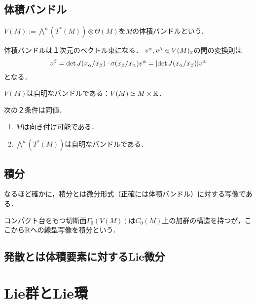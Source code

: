 \documentclass[uplatex,dvipdfmx]{jsreport}
\begin{document}
\subsection{体積バンドル}

\begin{definition}
    $V(M):=\bigwedge^n(T^*(M))\otimes\Theta(M)$を$M$の体積バンドルという．
\end{definition}
\begin{remarks}
    体積バンドルは１次元のベクトル束になる．
    $v^\alpha,v^\beta\in V(M)_x$の間の変換則は
    \[v^\beta=\det J(x_\alpha/x_\beta)\cdot\sigma(x_\beta/x_\alpha)v^\alpha=\lvert\det J(x_\alpha/x_\beta)\rvert v^\alpha\]
    となる．
\end{remarks}

\begin{theorem}
    $V(M)$は自明なバンドルである：$V(M)\simeq M\times\mathbb{R}$．
\end{theorem}

\begin{corollary}
    次の２条件は同値．
    \begin{enumerate}
        \item $M$は向き付け可能である．
        \item $\bigwedge^n(T^*(M))$は自明なバンドルである．
    \end{enumerate}
\end{corollary}

\subsection{積分}

\begin{tcolorbox}[colframe=ForestGreen, colback=ForestGreen!10!white,breakable,colbacktitle=ForestGreen!40!white,coltitle=black,fonttitle=\bfseries\sffamily,
title=]
    なるほど確かに，積分とは微分形式（正確には体積バンドル）に対する写像である．
\end{tcolorbox}

\begin{definition}
    コンパクト台をもつ切断面$\Gamma_0(V(M))$は$C_0(M)$上の加群の構造を持つが，ここから$\mathbb{R}$への線型写像を積分という．
\end{definition}

\subsection{発散とは体積要素に対するLie微分}

\section{Lie群とLie環}
\end{document}
